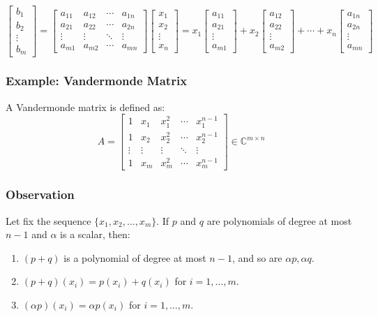 \documentclass[11pt]{article}
\begin{document}
\[\begin{bmatrix}
b_1 \\
b_2 \\
\vdots \\
b_m
\end{bmatrix} =
\begin{bmatrix}
a_{11} & a_{12} & \cdots & a_{1n} \\
a_{21} & a_{22} & \cdots & a_{2n} \\
\vdots & \vdots & \ddots & \vdots \\
a_{m1} & a_{m2} & \cdots & a_{mn}
\end{bmatrix}
\begin{bmatrix}
x_1 \\
x_2 \\
\vdots \\
x_n
\end{bmatrix} =
x_1
\begin{bmatrix}
a_{11} \\
a_{21} \\
\vdots \\
a_{m1}
\end{bmatrix} +
x_2
\begin{bmatrix}
a_{12} \\
a_{22} \\
\vdots \\
a_{m2}
\end{bmatrix} + \cdots +
x_n
\begin{bmatrix}
a_{1n} \\
a_{2n} \\
\vdots \\
a_{mn}
\end{bmatrix}\]

\subsubsection*{Example: Vandermonde Matrix}
A Vandermonde matrix is defined as:
\[
A = \begin{bmatrix}
1 & x_1 & x_1^2 & \cdots & x_1^{n-1} \\
1 & x_2 & x_2^2 & \cdots & x_2^{n-1} \\
\vdots & \vdots & \vdots & \ddots & \vdots \\
1 & x_m & x_m^2 & \cdots & x_m^{n-1}
\end{bmatrix} \in \mathbb{C}^{m \times n}
\]

\subsubsection*{Observation}
Let fix the sequence \( \{x_1, x_2, \ldots, x_m \} \). If $p$ and $q$ are polynomials of degree at most $n-1$ and $\alpha$ is a scalar, then:
\begin{enumerate}
    \item $(p + q)$ is a polynomial of degree at most $n-1$, and so are $\alpha p, \alpha q$.
    \item $(p + q)(x_i) = p(x_i) + q(x_i)$ for $i = 1, \ldots, m$.
    \item $(\alpha p)(x_i) = \alpha p(x_i)$ for $i = 1, \ldots, m$.
\end{enumerate}
\end{document}
